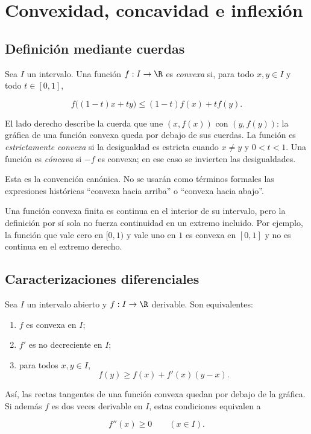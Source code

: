 \section{Convexidad, concavidad e inflexión}
\label{sec:convexidad-inflexion}

\subsection{Definición mediante cuerdas}

\begin{definicion}
Sea \(I\) un intervalo. Una función \(f:I\to\R\) es \emph{convexa} si, para
todo \(x,y\in I\) y todo \(t\in[0,1]\),

\[
  f\bigl((1-t)x+ty\bigr)
  \le (1-t)f(x)+tf(y).
\]
\end{definicion}

El lado derecho describe la cuerda que une \((x,f(x))\) con \((y,f(y))\): la
gráfica de una función convexa queda por debajo de sus cuerdas. La función es
\emph{estrictamente convexa} si la desigualdad es estricta cuando
\(x\ne y\) y \(0<t<1\). Una función es \emph{cóncava} si \(-f\) es convexa;
en ese caso se invierten las desigualdades.

Esta es la convención canónica. No se usarán como términos formales las
expresiones históricas ``convexa hacia arriba'' o ``convexa hacia abajo''.

Una función convexa finita es continua en el interior de su intervalo, pero
la definición por sí sola no fuerza continuidad en un extremo incluido. Por
ejemplo, la función que vale cero en \([0,1)\) y vale uno en \(1\) es convexa
en \([0,1]\) y no es continua en el extremo derecho.

\subsection{Caracterizaciones diferenciales}

\begin{teorema}
Sea \(I\) un intervalo abierto y \(f:I\to\R\) derivable. Son equivalentes:

\begin{enumerate}
  \item \(f\) es convexa en \(I\);
  \item \(f'\) es no decreciente en \(I\);
  \item para todos \(x,y\in I\),
        \[
          f(y)\ge f(x)+f'(x)(y-x).
        \]
\end{enumerate}

Así, las rectas tangentes de una función convexa quedan por debajo de la
gráfica. Si además \(f\) es dos veces derivable en \(I\), estas condiciones
equivalen a

\[
  f''(x)\ge0 \qquad(x\in I).
\]
\end{teorema}

